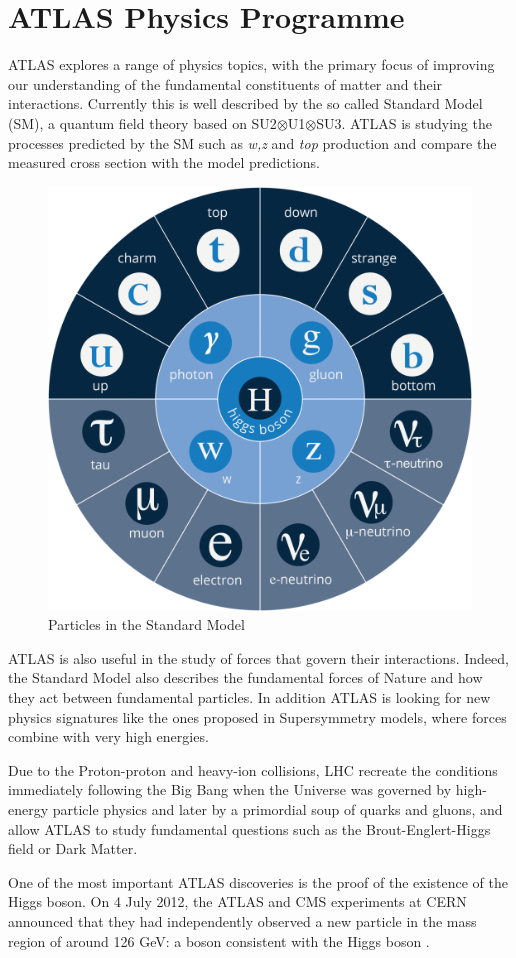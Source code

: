 \documentclass[a4paper, oneside]{book}
\begin{document}
		\section{ATLAS Physics Programme}
			\cite{STD Model}ATLAS explores a range of physics topics, with the primary focus of improving our understanding of the fundamental constituents of matter and their interactions. Currently this is well described by the so called Standard Model (SM), a quantum field theory based on SU2$\otimes$U1$\otimes$SU3.
			ATLAS is studying the processes predicted by the SM such as \textit{w,z} and \textit{top} production and compare the measured cross section with the model predictions.
			\begin{figure}[h!]
				\centering
				\includegraphics[width=.3\textwidth]{tesi_images/STD_model.png}
				\caption{Particles in the Standard Model}
				\label{fig:STD model}
			\end{figure}
			ATLAS is also useful in the study of forces that govern their interactions. Indeed, the Standard Model also describes the fundamental forces of Nature and how they act between fundamental particles. In addition ATLAS is looking for new physics signatures like the ones proposed in Supersymmetry models, where forces combine with very high energies.
			
			Due to the Proton-proton and heavy-ion collisions, LHC  recreate the conditions immediately following the Big Bang when the Universe was governed by high-energy particle physics and later by a primordial soup of quarks and gluons, and allow ATLAS to study fundamental questions such as the Brout-Englert-Higgs field or Dark Matter.
			
			One of the most important ATLAS discoveries is the proof of the existence of the Higgs boson. On 4 July 2012, the ATLAS and CMS \cite{CMS} experiments at CERN announced that they had independently observed a new particle in the mass region of around 126 GeV: a boson consistent with the Higgs boson \cite{Higgs}.
				
\end{document}
